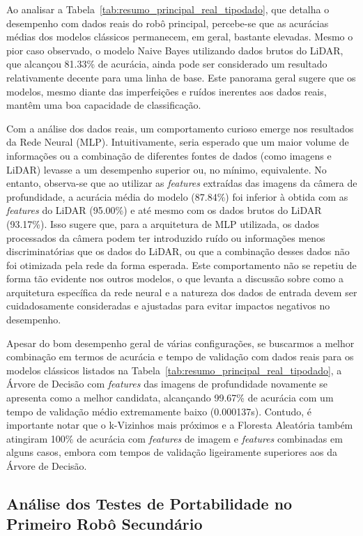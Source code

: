 Ao analisar a Tabela~\ref{tab:resumo_principal_real_tipodado}, que detalha o desempenho com dados reais do robô principal, percebe-se que as acurácias médias dos modelos clássicos permanecem, em geral, bastante elevadas. Mesmo o pior caso observado, o modelo Naive Bayes utilizando dados brutos do LiDAR, que alcançou 81.33\% de acurácia, ainda pode ser considerado um resultado relativamente decente para uma linha de base. Este panorama geral sugere que os modelos, mesmo diante das imperfeições e ruídos inerentes aos dados reais, mantêm uma boa capacidade de classificação.

Com a análise dos dados reais, um comportamento curioso emerge nos resultados da Rede Neural (MLP). Intuitivamente, seria esperado que um maior volume de informações ou a combinação de diferentes fontes de dados (como imagens e LiDAR) levasse a um desempenho superior ou, no mínimo, equivalente. No entanto, observa-se que ao utilizar as \textit{features} extraídas das imagens da câmera de profundidade, a acurácia média do modelo (87.84\%) foi inferior à obtida com as \textit{features} do LiDAR (95.00\%) e até mesmo com os dados brutos do LiDAR (93.17\%). Isso sugere que, para a arquitetura de MLP utilizada, os dados processados da câmera podem ter introduzido ruído ou informações menos discriminatórias que os dados do LiDAR, ou que a combinação desses dados não foi otimizada pela rede da forma esperada. Este comportamento não se repetiu de forma tão evidente nos outros modelos, o que levanta a discussão sobre como a arquitetura específica da rede neural e a natureza dos dados de entrada devem ser cuidadosamente consideradas e ajustadas para evitar impactos negativos no desempenho.

Apesar do bom desempenho geral de várias configurações, se buscarmos a melhor combinação em termos de acurácia e tempo de validação com dados reais para os modelos clássicos listados na Tabela~\ref{tab:resumo_principal_real_tipodado}, a Árvore de Decisão com \textit{features} das imagens de profundidade novamente se apresenta como a melhor candidata, alcançando 99.67\% de acurácia com um tempo de validação médio extremamente baixo (0.000137s). Contudo, é importante notar que o k-Vizinhos mais próximos e a Floresta Aleatória também atingiram 100\% de acurácia com \textit{features} de imagem e \textit{features} combinadas em alguns casos, embora com tempos de validação ligeiramente superiores aos da Árvore de Decisão.

\subsection{Análise dos Testes de Portabilidade no Primeiro Robô Secundário}

